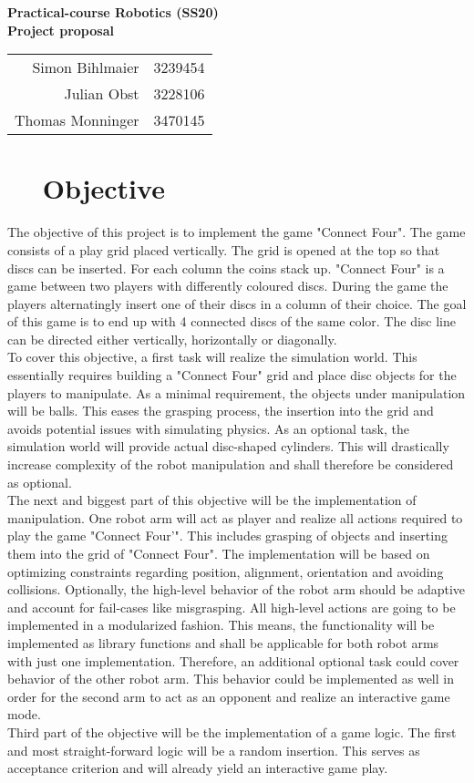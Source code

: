 \documentclass[11pt,pdftex,a4paper]{article}
\newcounter{sheetnumber}
\newcounter{exnum}
\renewcommand{\title}
{\begin{center}
		\begin{Huge}
            \textbf{Practical-course Robotics (SS20)}\\[0.3cm]
			 \textbf{Project proposal} \\[0.3cm]
		\end{Huge}
		
		\begin{tabular}{rl}
			Simon Bihlmaier	 	 & 3239454 \\
			Julian Obst 		 & 3228106 \\
			Thomas Monninger	 & 3470145 \\
		\end{tabular}
		
	\end{center}
	
}
\newcommand{\ex}[1]{\section*{\theexnum $\quad$ #1 \stepcounter{exnum}}}
\begin{document}
	
	
	\setcounter{exnum}{1}
	\setcounter{sheetnumber}{0}
	\thispagestyle{empty}
	\title

    \ex{Objective}
	The objective of this project is to implement the game "Connect Four". The game consists of a play grid placed vertically. The grid is opened at the top so that discs can be inserted. For each column the coins stack up. 
	"Connect Four" is a game between two players with differently coloured discs. During the game the players alternatingly insert one of their discs in a column of their choice. The goal of this game is to end up with 4 connected discs of the same color. The disc line can be directed either vertically, horizontally or diagonally.\\
	To cover this objective, a first task will realize the simulation world. This essentially requires building a "Connect Four" grid and place disc objects for the players to manipulate. As a minimal requirement, the objects under manipulation will be balls. This eases the grasping process, the insertion into the grid and avoids potential issues with simulating physics. 
	As an optional task, the simulation world will provide actual disc-shaped cylinders. This will drastically increase complexity of the robot manipulation and shall therefore be considered as optional. \\
	The next and biggest part of this objective will be the implementation of manipulation. One robot arm will act as player and realize all actions required to play the game "Connect Four'". This includes grasping of objects and inserting them into the grid of "Connect Four". 
	The implementation will be based on optimizing constraints regarding position, alignment, orientation and avoiding collisions. Optionally, the high-level behavior of the robot arm should be adaptive and account for fail-cases like misgrasping. 
	All high-level actions are going to be implemented in a modularized fashion. This means, the functionality will be implemented as library functions and shall be applicable for both robot arms with just one implementation.
	Therefore, an additional optional task could cover behavior of the other robot arm. This behavior could be implemented as well in order for the second arm to act as an opponent and realize an interactive game mode.\\
	Third part of the objective will be the implementation of a game logic. The first and most straight-forward logic will be a random insertion. This serves as acceptance criterion and will already yield an interactive game play. 
\end{document}
